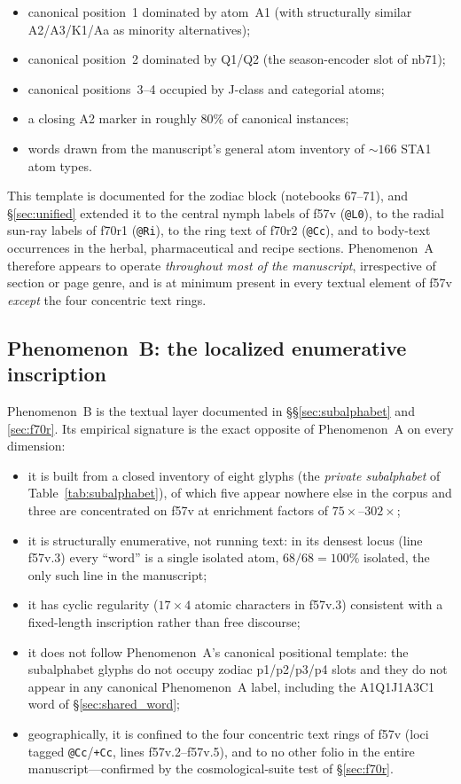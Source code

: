 \begin{itemize}[itemsep=0pt,topsep=2pt]
\item canonical position~1 dominated by atom~A1 (with structurally similar
A2/A3/K1/Aa as minority alternatives);
\item canonical position~2 dominated by Q1/Q2 (the season-encoder slot of
nb71);
\item canonical positions~3--4 occupied by J-class and categorial atoms;
\item a closing A2 marker in roughly $80\%$ of canonical instances;
\item words drawn from the manuscript's general atom inventory of $\sim
166$ STA1 atom types.
\end{itemize}

This template is documented for the zodiac block (notebooks 67--71), and
\S\ref{sec:unified} extended it to the central nymph labels of f57v
(\texttt{@L0}), to the radial sun-ray labels of f70r1 (\texttt{@Ri}), to the
ring text of f70r2 (\texttt{@Cc}), and to body-text occurrences in the
herbal, pharmaceutical and recipe sections. Phenomenon~A therefore appears
to operate \emph{throughout most of the manuscript}, irrespective of section
or page genre, and is at minimum present in every textual element of f57v
\emph{except} the four concentric text rings.

\subsection{Phenomenon~B: the localized enumerative inscription}
\label{sec:phenomenonB}

Phenomenon~B is the textual layer documented in \S\S\ref{sec:subalphabet}
and \ref{sec:f70r}. Its empirical signature is the exact opposite of
Phenomenon~A on every dimension:

\begin{itemize}[itemsep=0pt,topsep=2pt]
\item it is built from a closed inventory of eight glyphs (the
\emph{private subalphabet} of Table~\ref{tab:subalphabet}), of which five
appear nowhere else in the corpus and three are concentrated on f57v at
enrichment factors of $75\times$--$302\times$;
\item it is structurally enumerative, not running text: in its densest
locus (line f57v.3) every ``word'' is a single isolated atom, $68/68 =
100\%$ isolated, the only such line in the manuscript;
\item it has cyclic regularity ($17 \times 4$ atomic characters in
f57v.3) consistent with a fixed-length inscription rather than free
discourse;
\item it does not follow Phenomenon~A's canonical positional template:
the subalphabet glyphs do not occupy zodiac p1/p2/p3/p4 slots and they do
not appear in any canonical Phenomenon~A label, including the
A1Q1J1A3C1 word of \S\ref{sec:shared_word};
\item geographically, it is confined to the four concentric text rings of
f57v (loci tagged \texttt{@Cc}/\texttt{+Cc}, lines f57v.2--f57v.5), and
to no other folio in the entire manuscript---confirmed by the
cosmological-suite test of \S\ref{sec:f70r}.
\end{itemize}

